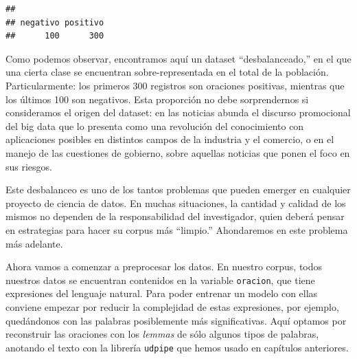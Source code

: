 \documentclass[
]{book}
\newenvironment{Shaded}{\begin{snugshade}}{\end{snugshade}}
\newcommand{\AttributeTok}[1]{\textcolor[rgb]{0.77,0.63,0.00}{#1}}
\newcommand{\CommentTok}[1]{\textcolor[rgb]{0.56,0.35,0.01}{\textit{#1}}}
\newcommand{\FunctionTok}[1]{\textcolor[rgb]{0.00,0.00,0.00}{#1}}
\newcommand{\NormalTok}[1]{#1}
\newcommand{\OtherTok}[1]{\textcolor[rgb]{0.56,0.35,0.01}{#1}}
\newcommand{\SpecialCharTok}[1]{\textcolor[rgb]{0.00,0.00,0.00}{#1}}
\newcommand{\StringTok}[1]{\textcolor[rgb]{0.31,0.60,0.02}{#1}}
\begin{document}
\begin{Shaded}
\end{Shaded}

\begin{verbatim}
## 
## negativo positivo 
##      100      300
\end{verbatim}

Como podemos observar, encontramos aquí un dataset ``desbalanceado,'' en el que una cierta clase se encuentran sobre-representada en el total de la población. Particularmente: los primeros 300 registros son oraciones positivas, mientras que los últimos 100 son negativos.
Esta proporción no debe sorprendernos si consideramos el origen del dataset: en las noticias abunda el discurso promocional del big data que lo presenta como una revolución del conocimiento con aplicaciones posibles en distintos campos de la industria y el comercio, o en el manejo de las cuestiones de gobierno, sobre aquellas noticias que ponen el foco en sus riesgos.

Este desbalanceo es uno de los tantos problemas que pueden emerger en cualquier proyecto de ciencia de datos. En muchas situaciones, la cantidad y calidad de los mismos no dependen de la responsabilidad del investigador, quien deberá pensar en estrategias para hacer su corpus más ``limpio.'' Ahondaremos en este problema más adelante.

Ahora vamos a comenzar a preprocesar los datos. En nuestro corpus, todos nuestros datos se encuentran contenidos en la variable \texttt{oracion}, que tiene expresiones del lenguaje natural. Para poder entrenar un modelo con ellas conviene empezar por reducir la complejidad de estas expresiones, por ejemplo, quedándonos con las palabras posiblemente más significativas. Aquí optamos por reconstruir las oraciones con los \emph{lemmas} de sólo algunos tipos de palabras, anotando el texto con la librería \texttt{udpipe} que hemos usado en capítulos anteriores.

\begin{Shaded}
\end{Shaded}
\end{document}
